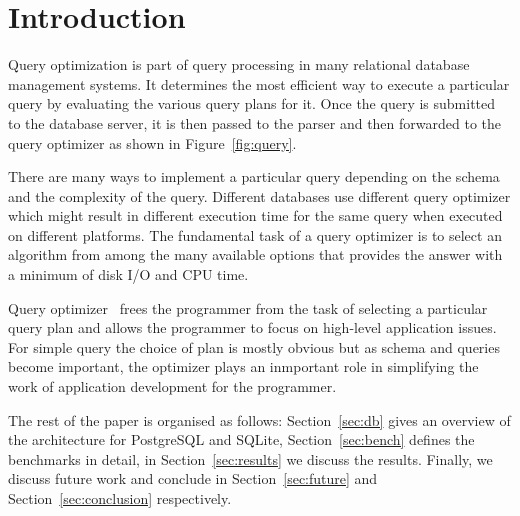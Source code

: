
\section{Introduction}
\label{sec:intro}


Query optimization is part of query processing in many relational database management systems. It determines the most efficient way to execute a particular query by evaluating the various query plans for it. Once the query is submitted to the database server, it is then passed to the parser and then forwarded to the query optimizer as shown in Figure~\ref{fig:query}.

There are many ways to implement a particular query depending on the schema and the complexity of the query. Different databases use different query optimizer which might result in different execution time for the same query when executed on different platforms. The fundamental task of a query optimizer is to select an algorithm from among the many available options that provides the answer with a minimum of disk I/O and CPU time.

Query optimizer~\cite{ref:sqlite3} frees the programmer from the task of selecting a particular query plan and allows the programmer to focus on high-level application issues. For simple query the choice of plan is mostly obvious but as schema and queries become important, the optimizer plays an inmportant role in simplifying the work of application development for the programmer.

The rest of the paper is organised as follows: Section~\ref{sec:db} gives an overview of the architecture for PostgreSQL and SQLite, Section~\ref{sec:bench} defines the benchmarks in detail, in Section~\ref{sec:results} we discuss the results. Finally, we discuss future work and conclude in Section~\ref{sec:future} and Section~\ref{sec:conclusion} respectively. 


